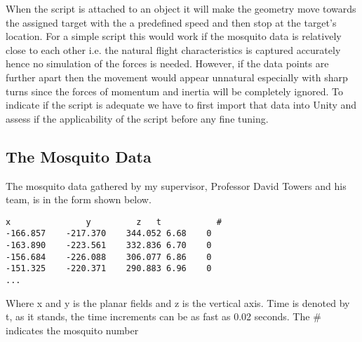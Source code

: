 When the script is attached to an object it will make the geometry move towards the assigned target with the a predefined speed and then stop at the target's location. For a simple script this would work if the mosquito data is relatively close to each other i.e. the natural flight characteristics is captured accurately hence no simulation of the forces is needed. However, if the data points are further apart then the movement would appear unnatural especially with sharp turns since the forces of momentum and inertia will be completely ignored. To indicate if the script is adequate we have to first import that data into Unity and assess if the applicability of the script before any fine tuning.



\subsection{The Mosquito Data}
The mosquito data gathered by my supervisor, Professor David Towers and his team, is in the form shown below.

\begin{verbatim}
x	            y	      z	  t           #
-166.857	-217.370	344.052	6.68	0
-163.890	-223.561	332.836	6.70	0
-156.684	-226.088	306.077	6.86	0
-151.325	-220.371	290.883	6.96	0
...
\end{verbatim}

Where x and y is the planar fields and z is the vertical axis. Time is denoted by t, as it stands, the time increments can be as fast as 0.02 seconds. The \# indicates the mosquito number 
